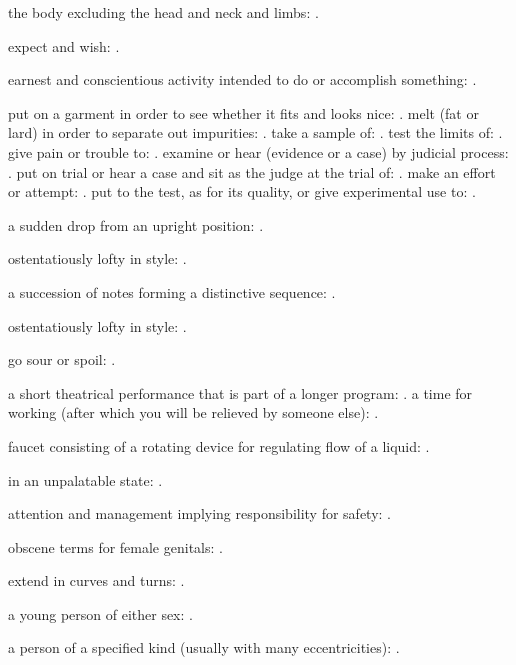  the body excluding the head and neck and limbs: .

  expect and wish: .

  earnest and conscientious activity intended to do or accomplish something: .

  put on a garment in order to see whether it fits and looks nice: . melt (fat or lard) in order to separate out impurities: . take a sample of: . test the limits of: . give pain or trouble to: . examine or hear (evidence or a case) by judicial process: . put on trial or hear a case and sit as the judge at the trial of: . make an effort or attempt: . put to the test, as for its quality, or give experimental use to: .

  a sudden drop from an upright position: .

  ostentatiously lofty in style: .

  a succession of notes forming a distinctive sequence: .

  ostentatiously lofty in style: .

  go sour or spoil: .

  a short theatrical performance that is part of a longer program: . a time for working (after which you will be relieved by someone else): .

  faucet consisting of a rotating device for regulating flow of a liquid: .

  in an unpalatable state: .

  attention and management implying responsibility for safety: .

  obscene terms for female genitals: .

  extend in curves and turns: .

  a young person of either sex: .

  a person of a specified kind (usually with many eccentricities): .

